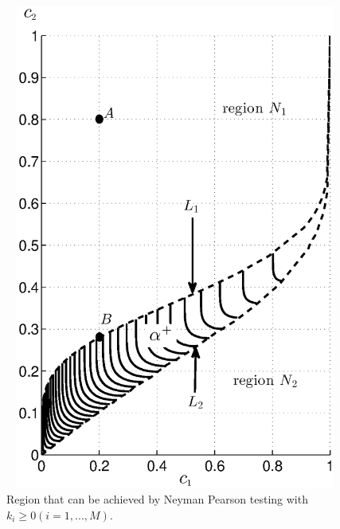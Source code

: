 \begin{figure}[!t]
\centering
\includegraphics[width=12cm, height = 16cm]{3/singlecontour.eps}
\caption{Region that can be achieved by Neyman Pearson testing with $k_i \geq 0 (i=1, ..., M)$.}
\label{pic: contour for m0 gaussian}
\end{figure}

